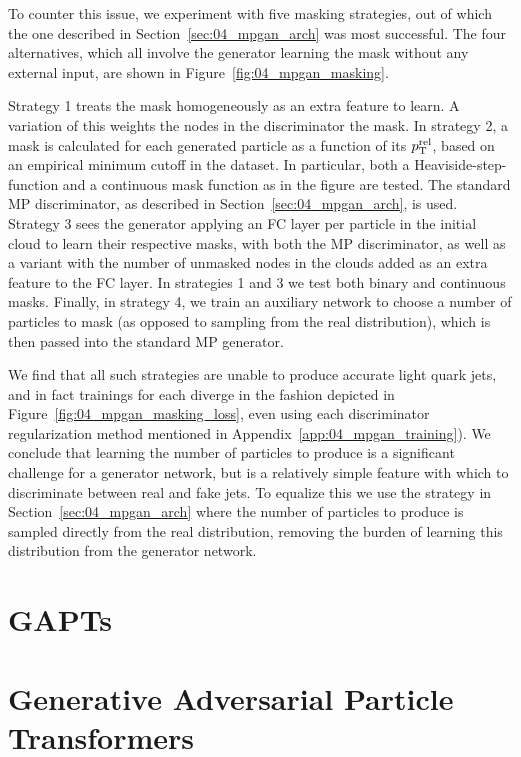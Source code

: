 To counter this issue, we experiment with five masking strategies, out of which the one described in Section~\ref{sec:04_mpgan_arch} was most successful.
The four alternatives, which all involve the generator learning the mask without any external input, are shown in Figure~\ref{fig:04_mpgan_masking}.

Strategy 1 treats the mask homogeneously as an extra feature to learn.
A variation of this weights the nodes in the discriminator the mask.
In strategy 2, a mask is calculated for each generated particle as a function of its $p_{\mathrm{T}}^{\mathrm{rel}}$, based on an empirical minimum cutoff in the dataset.
In particular, both a Heaviside-step-function and a continuous mask function as in the figure are tested.
The standard MP discriminator, as described in Section~\ref{sec:04_mpgan_arch}, is used.
Strategy 3 sees the generator applying an FC layer per particle in the initial cloud to learn their respective masks, with both the MP discriminator, as well as a variant with the number of unmasked nodes in the clouds added as an extra feature to the FC layer.
In strategies 1 and 3 we test
both binary and continuous masks.
Finally, in strategy 4, we train an auxiliary network to choose a number of particles to mask (as opposed to sampling from the real distribution), which is then passed into the standard MP generator.

We find that all such strategies are unable to produce accurate light quark jets, and in fact trainings for each diverge in the fashion depicted in Figure~\ref{fig:04_mpgan_masking_loss}, even using each discriminator regularization method mentioned in Appendix~\ref{app:04_mpgan_training}).
We conclude that learning the number of particles to produce is a significant challenge for a generator network, but is a relatively simple feature with which to discriminate between real and fake jets.
To equalize this we use the strategy in Section~\ref{sec:04_mpgan_arch} where the number of particles to produce is sampled directly from the real distribution, removing the burden of learning this distribution from the generator network.

\clearpage
\ifdefined\HCode
    \section{GAPTs}
\else
    \section{Generative Adversarial Particle Transformers}
\fi


